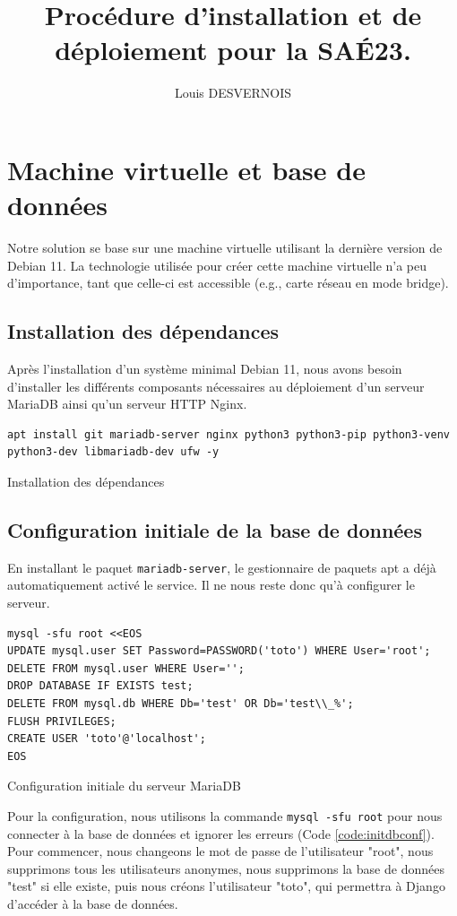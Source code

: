 \documentclass{article}
\author{Louis DESVERNOIS}
\title{Procédure d'installation et de déploiement pour la SAÉ23.}
\begin{document}
\maketitle
\tableofcontents
\listoffigures
\listoflistings
\newpage
\section{Machine virtuelle et base de données}
    Notre solution se base sur une machine virtuelle utilisant la dernière version de Debian 11. La technologie utilisée pour créer cette machine virtuelle n'a peu d'importance, tant que celle-ci est accessible (e.g., carte réseau en mode bridge). 

        \subsection{Installation des dépendances}
        Après l'installation d'un système minimal Debian 11, nous avons besoin d'installer les différents composants nécessaires au déploiement d'un serveur MariaDB ainsi qu'un serveur HTTP Nginx.
        \begin{listing}[H]
            \begin{verbatim}
apt install git mariadb-server nginx python3 python3-pip python3-venv python3-dev libmariadb-dev ufw -y
            \end{verbatim}
            \caption{Installation des dépendances}
            \label{code:deps-install}
        \end{listing}

        \subsection{Configuration initiale de la base de données}
        En installant le paquet \verb|mariadb-server|, le gestionnaire de paquets apt a déjà automatiquement activé le service. Il ne nous reste donc qu'à configurer le serveur.
        \begin{listing}[H]
            \begin{verbatim}
mysql -sfu root <<EOS
UPDATE mysql.user SET Password=PASSWORD('toto') WHERE User='root';
DELETE FROM mysql.user WHERE User='';
DROP DATABASE IF EXISTS test;
DELETE FROM mysql.db WHERE Db='test' OR Db='test\\_%';
FLUSH PRIVILEGES;
CREATE USER 'toto'@'localhost';
EOS
            \end{verbatim}
            \caption{Configuration initiale du serveur MariaDB}
            \label{code:initdbconf}
        \end{listing}
        Pour la configuration, nous utilisons la commande \verb|mysql -sfu root| pour nous connecter à la base de données et ignorer les erreurs (Code \ref{code:initdbconf}). Pour commencer, nous changeons le mot de passe de l'utilisateur "root", nous supprimons tous les utilisateurs anonymes, nous supprimons la base de données "test" si elle existe, puis nous créons l'utilisateur "toto", qui permettra à Django d'accéder à la base de données.
\end{document}
